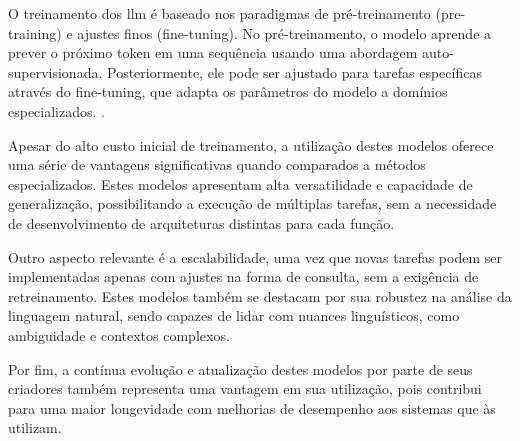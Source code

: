 O treinamento dos \gls{llm} é baseado nos paradigmas de pré-treinamento (pre-training) e ajustes finos (fine-tuning). No pré-treinamento, o modelo aprende a prever o próximo token em uma sequência usando uma abordagem auto-supervisionada. Posteriormente, ele pode ser ajustado para tarefas específicas através do fine-tuning, que adapta os parâmetros do modelo a domínios especializados. \cite{Zhou2023}.

Apesar do alto custo inicial de treinamento, a utilização destes modelos oferece uma série de vantagens significativas quando comparados a métodos especializados. Estes modelos apresentam alta versatilidade e capacidade de generalização, possibilitando a execução de múltiplas tarefas, sem a necessidade de desenvolvimento de arquiteturas distintas para cada função.

Outro aspecto relevante é a escalabilidade, uma vez que novas tarefas podem ser implementadas apenas com ajustes na forma de consulta, sem a exigência de retreinamento. Estes modelos também se destacam por sua robustez na análise da linguagem natural, sendo capazes de lidar com nuances linguísticos, como ambiguidade e contextos complexos.

Por fim, a contínua evolução e atualização destes modelos por parte de seus criadores também representa uma vantagem em sua utilização, pois contribui para uma maior longevidade com melhorias de desempenho aos sistemas que às utilizam. 